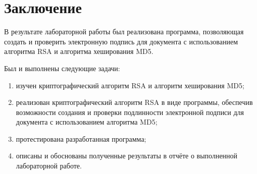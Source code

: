 \chapter*{Заключение}

В результате лабораторной работы был реализована программа, позволяющая создать и проверить электронную подпись для документа с использованием алгоритма RSA и алгоритма хеширования MD5.

Был и выполнены следующие задачи:
\begin{enumerate}[label=\arabic*)]
	\item изучен криптографический алгоритм RSA и алгоритм хеширования MD5;
    \item реализован криптографический алгоритм RSA в виде программы, обеспечив возможности создания и проверки подлинности электронной подписи для документа с использованием алгоритма MD5;
	\item протестирована разработанная программа;
	\item описаны и обоснованы полученные результаты в отчёте о выполненной лабораторной работе.
\end{enumerate}
